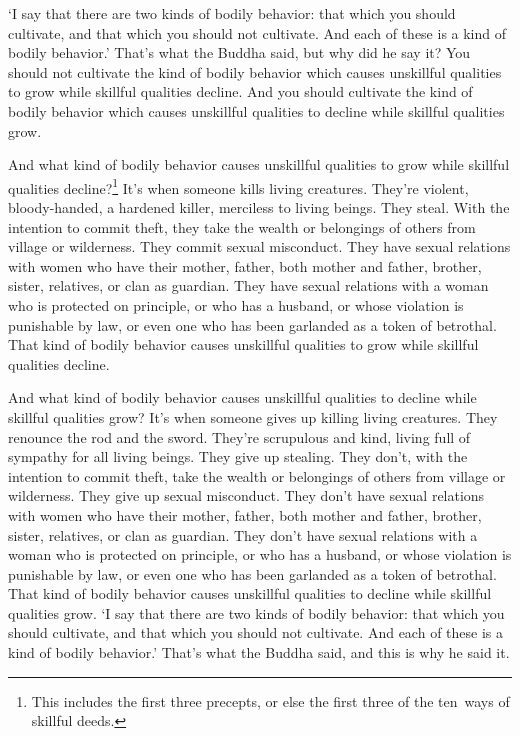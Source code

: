 \documentclass[12pt,openany]{book}%
\begin{document}
‘I say that there are two kinds of bodily behavior: that which you should cultivate, and that which you should not cultivate. And each of these is a kind of bodily behavior.’ That’s what the Buddha said, but why did he say it? You should not cultivate the kind of bodily behavior which causes unskillful qualities to grow while skillful qualities decline. And you should cultivate the kind of bodily behavior which causes unskillful qualities to decline while skillful qualities grow. 

And what kind of bodily behavior causes unskillful qualities to grow while skillful qualities decline?\footnote{This includes the first three precepts, or else the first three of the ten ways of skillful deeds. } It’s when someone kills living creatures. They’re violent, bloody-handed, a hardened killer, merciless to living beings. They steal. With the intention to commit theft, they take the wealth or belongings of others from village or wilderness. They commit sexual misconduct. They have sexual relations with women who have their mother, father, both mother and father, brother, sister, relatives, or clan as guardian. They have sexual relations with a woman who is protected on principle, or who has a husband, or whose violation is punishable by law, or even one who has been garlanded as a token of betrothal. That kind of bodily behavior causes unskillful qualities to grow while skillful qualities decline. 

And what kind of bodily behavior causes unskillful qualities to decline while skillful qualities grow? It’s when someone gives up killing living creatures. They renounce the rod and the sword. They’re scrupulous and kind, living full of sympathy for all living beings. They give up stealing. They don’t, with the intention to commit theft, take the wealth or belongings of others from village or wilderness. They give up sexual misconduct. They don’t have sexual relations with women who have their mother, father, both mother and father, brother, sister, relatives, or clan as guardian. They don’t have sexual relations with a woman who is protected on principle, or who has a husband, or whose violation is punishable by law, or even one who has been garlanded as a token of betrothal. That kind of bodily behavior causes unskillful qualities to decline while skillful qualities grow. ‘I say that there are two kinds of bodily behavior: that which you should cultivate, and that which you should not cultivate. And each of these is a kind of bodily behavior.’ That’s what the Buddha said, and this is why he said it. 
\end{document}
